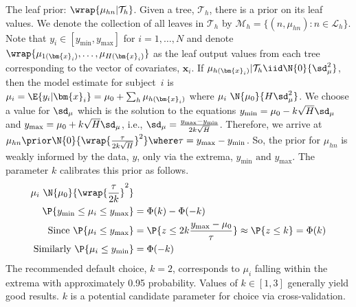 \documentclass[cmbright,doublespace]{WileySTAT-V1}
\theoremstyle{plain}
\begin{document}

The leaf prior: $\wrap{\mu_{hn}|\mathcal{T}_h}$.  Given a tree,
$\mathcal{T}_h$, there is a prior on its leaf values.
We denote the collection of all leaves in
$\mathcal{T}_h$ by
$\mathcal{M}_h=\{(n, \mu_{hn}): n \in \mathcal{L}_h \}$.
Note that $y_i \in [y_{\min}, y_{\max}]$ for $i=1, \dots, N$ and denote 
$\wrap{\mu_{1(\bm{x}_i)}, \dots, \mu_{H(\bm{x}_i)}}$ as the leaf output values from each 
tree corresponding to the vector of covariates, $\bm{x}_i$.
If $\mu_{h(\bm{x}_i)}|\mathcal{T}_h \iid \N{0}{\sd_{\mu}^2}$, then the model 
estimate for subject~$i$ is 
$\mu_i=\E{y_i|\bm{x}_i}=\mu_0+\sum_h\mu_{h(\bm{x}_i)}$ where
$\mu_i ~ \N{\mu_0}{H \sd_{\mu}^2}$.  We
choose a value for $\sd_{\mu}$ which is the solution to the equations
$y_{\min}=\mu_0-k\sqrt{H}\sd_{\mu}$
and $y_{\max}=\mu_0+k\sqrt{H}\sd_{\mu}$, i.e.,
$\sd_{\mu}=\frac{y_{\max}-y_{\min}}{2 k \sqrt{H}}$.
Therefore, we arrive at
$\mu_{hn} \prior \N{0}{\wrap{\frac{\tau}{2k\sqrt{H}}}^2} \where
\tau={y_{\max}-y_{\min}}$.  So, the prior for $\mu_{hn}$ is weakly 
informed by the data, $y$, only via the extrema,
$y_{\min}\mbox{\ and\ }y_{\max}$.  The parameter $k$ calibrates this
prior as follows.
\begin{align*}
\mu_i ~\N{\mu_0}{\wrap{\frac{\tau}{2 k}}^2}& \\
\P{y_{\min} \le \mu_i \le y_{\max}} &  = \Phi(k) - \Phi(-k)\\
\mbox{Since\ }\P{\mu_i \le y_{\max}} &= \P{z \le 2k \frac{y_{\max}-\mu_0}{\tau}} \approx
 \P{z \le k} = \Phi(k) \\
\mbox{Similarly\ }\P{\mu_i \le y_{\min}} &= \Phi(-k)
\end{align*}
The recommended default choice, $k=2$, corresponds to $\mu_i$
falling within the extrema with approximately 0.95 probability.
Values of $k \in [1, 3]$ generally yield good results.  
$k$ is a potential candidate parameter for choice via cross-validation.
\end{document}

